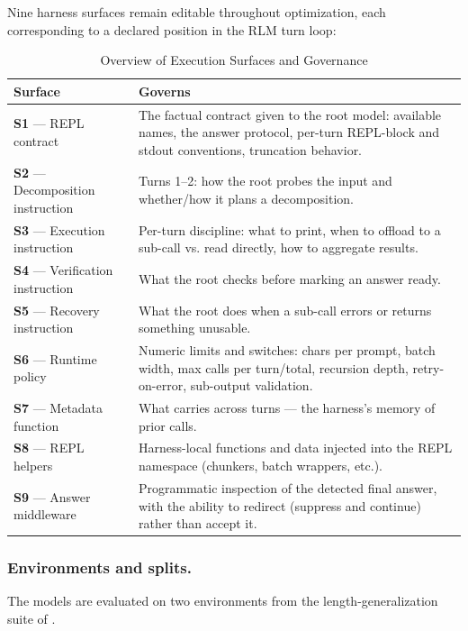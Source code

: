 \documentclass{article}
\begin{document}
Nine harness surfaces remain editable throughout optimization, each corresponding to a declared position in the RLM turn loop:
\begin{table}[htbp]
    \centering
    \renewcommand{\arraystretch}{1.4}
    \begin{tabular}{p{} p{}}
        \hline
        \textbf{Surface} & \textbf{Governs} \\
        \hline
        \textbf{S1} --- REPL contract & The factual contract given to the root model: available names, the answer protocol, per-turn REPL-block and stdout conventions, truncation behavior. \\
        \hline
        \textbf{S2} --- Decomposition instruction & Turns 1--2: how the root probes the input and whether/how it plans a decomposition. \\
        \hline
        \textbf{S3} --- Execution instruction & Per-turn discipline: what to print, when to offload to a sub-call vs. read directly, how to aggregate results. \\
        \hline
        \textbf{S4} --- Verification instruction & What the root checks before marking an answer ready. \\
        \hline
        \textbf{S5} --- Recovery instruction & What the root does when a sub-call errors or returns something unusable. \\
        \hline
        \textbf{S6} --- Runtime policy & Numeric limits and switches: chars per prompt, batch width, max calls per turn/total, recursion depth, retry-on-error, sub-output validation. \\
        \hline
        \textbf{S7} --- Metadata function & What carries across turns --- the harness's memory of prior calls. \\
        \hline
        \textbf{S8} --- REPL helpers & Harness-local functions and data injected into the REPL namespace (chunkers, batch wrappers, etc.). \\
        \hline
        \textbf{S9} --- Answer middleware & Programmatic inspection of the detected final answer, with the ability to redirect (suppress and continue) rather than accept it. \\
        \hline
    \end{tabular}
    \caption{Overview of Execution Surfaces and Governance}
    \label{tab:surfaces}
\end{table}
\newpage
\subsubsection{Environments and splits.}
The models are evaluated on two environments from the length-generalization suite of \citet{zhang2026harness}.
\end{document}
